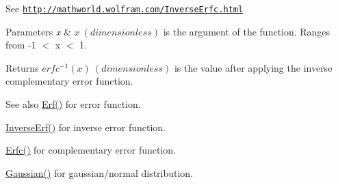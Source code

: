See \href{http://mathworld.wolfram.com/InverseErfc.html}{\tt http\+://mathworld.\+wolfram.\+com/\+Inverse\+Erfc.\+html} 
\begin{DoxyParams}{Parameters}
{\em x} & $x\ (dimensionless)$ is the argument of the function. Ranges from -\/1 $<$ x $<$ 1. \\
\hline
\end{DoxyParams}
\begin{DoxyReturn}{Returns}
$erfc^{-1}(x)\ (dimensionless)$ is the value after applying the inverse complementary error function. 
\end{DoxyReturn}
\begin{DoxySeeAlso}{See also}
\mbox{\hyperlink{group___e_g_x_math-_functions-_e_r_f_ga167bde890986906e6cd3b32adaa8e6a8}{Erf()}} for error function. 

\mbox{\hyperlink{group___e_g_x_math-_functions-_e_r_f_gab7cacb258ac31ab3929204dc1ed93400}{Inverse\+Erf()}} for inverse error function. 

\mbox{\hyperlink{group___e_g_x_math-_functions-_e_r_f_ga58f76263d205c47000068176d3116571}{Erfc()}} for complementary error function. 

\mbox{\hyperlink{group___e_g_x_math-_functions-_gaussian_ga647b46315081e299edc16a1c7f4e4032}{Gaussian()}} for gaussian/normal distribution. 
\end{DoxySeeAlso}
